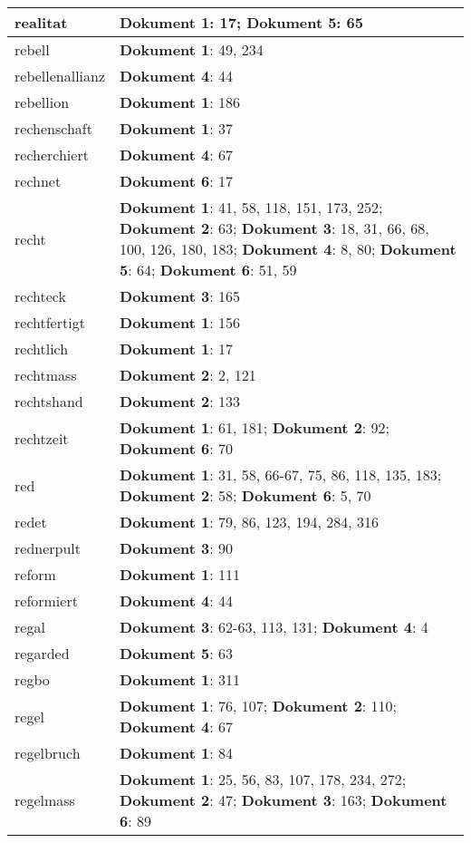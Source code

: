 \documentclass[a5paper]{article}
\begin{document}
\begin{longtable}[l]{|l|p{3in}|}
\hline
realitat & \textbf{Dokument 1}: 17; \textbf{Dokument 5}: 65 \\
\hline
rebell & \textbf{Dokument 1}: 49, 234 \\
\hline
rebellenallianz & \textbf{Dokument 4}: 44 \\
\hline
rebellion & \textbf{Dokument 1}: 186 \\
\hline
rechenschaft & \textbf{Dokument 1}: 37 \\
\hline
recherchiert & \textbf{Dokument 4}: 67 \\
\hline
rechnet & \textbf{Dokument 6}: 17 \\
\hline
recht & \textbf{Dokument 1}: 41, 58, 118, 151, 173, 252; \textbf{Dokument 2}: 63; \textbf{Dokument 3}: 18, 31, 66, 68, 100, 126, 180, 183; \textbf{Dokument 4}: 8, 80; \textbf{Dokument 5}: 64; \textbf{Dokument 6}: 51, 59 \\
\hline
rechteck & \textbf{Dokument 3}: 165 \\
\hline
rechtfertigt & \textbf{Dokument 1}: 156 \\
\hline
rechtlich & \textbf{Dokument 1}: 17 \\
\hline
rechtmass & \textbf{Dokument 2}: 2, 121 \\
\hline
rechtshand & \textbf{Dokument 2}: 133 \\
\hline
rechtzeit & \textbf{Dokument 1}: 61, 181; \textbf{Dokument 2}: 92; \textbf{Dokument 6}: 70 \\
\hline
red & \textbf{Dokument 1}: 31, 58, 66-67, 75, 86, 118, 135, 183; \textbf{Dokument 2}: 58; \textbf{Dokument 6}: 5, 70 \\
\hline
redet & \textbf{Dokument 1}: 79, 86, 123, 194, 284, 316 \\
\hline
rednerpult & \textbf{Dokument 3}: 90 \\
\hline
reform & \textbf{Dokument 1}: 111 \\
\hline
reformiert & \textbf{Dokument 4}: 44 \\
\hline
regal & \textbf{Dokument 3}: 62-63, 113, 131; \textbf{Dokument 4}: 4 \\
\hline
regarded & \textbf{Dokument 5}: 63 \\
\hline
regbo & \textbf{Dokument 1}: 311 \\
\hline
regel & \textbf{Dokument 1}: 76, 107; \textbf{Dokument 2}: 110; \textbf{Dokument 4}: 67 \\
\hline
regelbruch & \textbf{Dokument 1}: 84 \\
\hline
regelmass & \textbf{Dokument 1}: 25, 56, 83, 107, 178, 234, 272; \textbf{Dokument 2}: 47; \textbf{Dokument 3}: 163; \textbf{Dokument 6}: 89 \\

\end{longtable}
\end{document}
